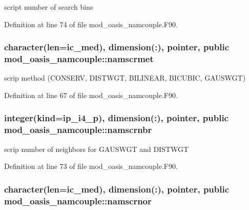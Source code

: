 script number of search bins 



Definition at line 74 of file mod\+\_\+oasis\+\_\+namcouple.\+F90.

\hypertarget{classmod__oasis__namcouple_a51c19e0892a72acc3dca2adb046ed175}{
\subsubsection[{namscrmet}]{\setlength{\rightskip}{0pt plus 5cm}character(len=ic\+\_\+med), dimension(\+:), pointer, public mod\+\_\+oasis\+\_\+namcouple\+::namscrmet}}\label{classmod__oasis__namcouple_a51c19e0892a72acc3dca2adb046ed175}


scrip method (C\+O\+N\+S\+E\+R\+V, D\+I\+S\+T\+W\+G\+T, B\+I\+L\+I\+N\+E\+A\+R, B\+I\+C\+U\+B\+I\+C, G\+A\+U\+S\+W\+G\+T) 



Definition at line 67 of file mod\+\_\+oasis\+\_\+namcouple.\+F90.

\hypertarget{classmod__oasis__namcouple_a20d614468823744b82118ee8cf2df852}{
\subsubsection[{namscrnbr}]{\setlength{\rightskip}{0pt plus 5cm}integer(kind=ip\+\_\+i4\+\_\+p), dimension(\+:), pointer, public mod\+\_\+oasis\+\_\+namcouple\+::namscrnbr}}\label{classmod__oasis__namcouple_a20d614468823744b82118ee8cf2df852}


scrip number of neighbors for G\+A\+U\+S\+W\+G\+T and D\+I\+S\+T\+W\+G\+T 



Definition at line 73 of file mod\+\_\+oasis\+\_\+namcouple.\+F90.

\hypertarget{classmod__oasis__namcouple_a392f40531007d5dcc084e6ad4a393fd7}{
\subsubsection[{namscrnor}]{\setlength{\rightskip}{0pt plus 5cm}character(len=ic\+\_\+med), dimension(\+:), pointer, public mod\+\_\+oasis\+\_\+namcouple\+::namscrnor}}\label{classmod__oasis__namcouple_a392f40531007d5dcc084e6ad4a393fd7}


